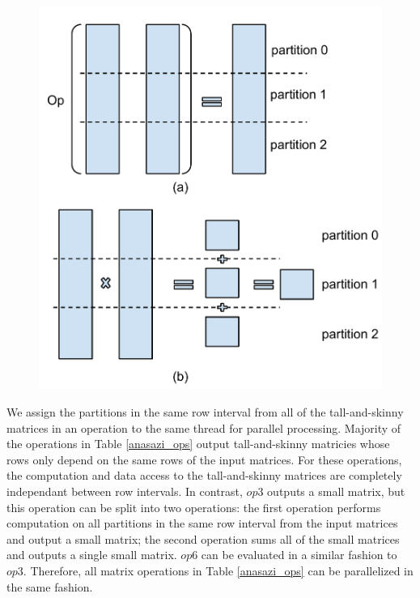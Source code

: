 \begin{figure}
\centering
\includegraphics[scale=0.4]{./mat_par.pdf}
\vspace{-5pt}
\caption{}
\vspace{-5pt}
\label{fig:mat_par}
\end{figure}

We assign the partitions in the same row interval from all of the tall-and-skinny
matrices in an operation to the same thread for parallel processing.
Majority of the operations in Table \ref{anasazi_ops} output tall-and-skinny
matricies whose rows only depend on the same rows of the input matrices.
For these operations, the computation and data access to the tall-and-skinny
matrices are completely independant between row intervals. 
In contrast, $op3$ outputs a small matrix, but this operation can be split into
two operations: the first operation performs computation on all partitions
in the same row interval from
the input matrices and output a small matrix; the second operation
sums all of the small matrices and outputs a single small matrix.
$op6$ can be evaluated in a similar fashion to $op3$.
Therefore, all matrix operations in Table \ref{anasazi_ops} can be parallelized
in the same fashion.

